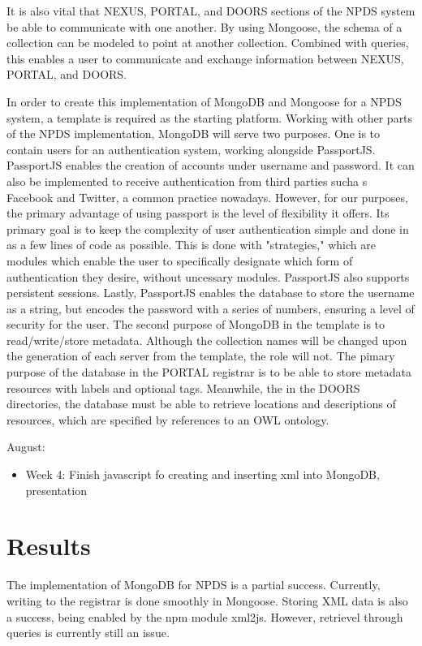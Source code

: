 \documentclass[10pt,twocolumn,twoside]{article}
\begin{document}
	It is also vital that NEXUS, PORTAL, and DOORS sections of the NPDS system be able to communicate with one another. By using Mongoose, the schema of a collection can be modeled to point at another collection. Combined with queries, this enables a user to communicate and exchange information between NEXUS, PORTAL, and DOORS.  \newline

	In order to create this implementation of MongoDB and Mongoose for a NPDS system, a template is required as the starting platform. Working with other parts of the NPDS implementation, MongoDB will serve two purposes. One is to contain users for an authentication system, working alongside PassportJS. PassportJS enables the creation of accounts under username and password. It can also be implemented to receive authentication from third parties sucha s Facebook and Twitter, a common practice nowadays. However, for our purposes, the primary advantage of using passport is the level of flexibility it offers. Its primary goal is to keep the complexity of user authentication simple and done in as a few lines of code as possible. This is done with "strategies," which are modules which enable the user to specifically designate which form of authentication they desire, without uncessary modules. PassportJS also supports persistent sessions. Lastly, PassportJS enables the database to store the username as a string, but encodes the password with a series of numbers, ensuring a level of security for the user. The second purpose of MongoDB in the template is to read/write/store metadata. Although the collection names will be changed upon the generation of each server from the template, the role will not. The pimary purpose of the database in the PORTAL registrar is to be able to store metadata resources with labels and optional tags. Meanwhile, the in the DOORS directories, the database must be able to retrieve locations and descriptions of resources, which are specified by references to an OWL ontology.

August:
\begin{itemize}
	\item Week 4: Finish javascript fo creating and inserting xml into MongoDB, presentation
\end{itemize}
	

\section*{Results}
	The implementation of MongoDB for NPDS is a partial success. Currently, writing to the registrar is done smoothly in Mongoose. Storing XML data is also a success, being enabled by the npm module xml2js. However, retrievel through queries is currently still an issue. 
\end{document}
